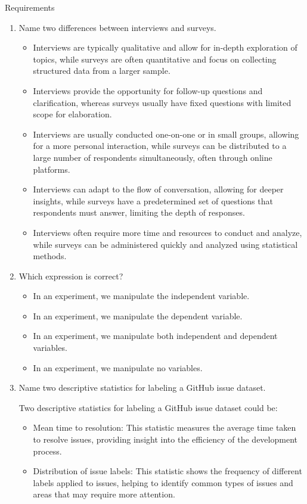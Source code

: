 \documentclass{article}
\begin{document}
\begin{exercise}{Requirements}
\begin{enumerate}
    \item Name two differences between interviews and surveys. \begin{solution}
        \begin{itemize}
          \item Interviews are typically qualitative and allow for in-depth exploration of topics, while surveys are often quantitative and focus on collecting structured data from a larger sample.
          \item Interviews provide the opportunity for follow-up questions and clarification, whereas surveys usually have fixed questions with limited scope for elaboration.
          \item Interviews are usually conducted one-on-one or in small groups, allowing for a more personal interaction, while surveys can be distributed to a large number of respondents simultaneously, often through online platforms.
          \item Interviews can adapt to the flow of conversation, allowing for deeper insights, while surveys have a predetermined set of questions that respondents must answer, limiting the depth of responses.
          \item Interviews often require more time and resources to conduct and analyze, while surveys can be administered quickly and analyzed using statistical methods.
        \end{itemize}
      \end{solution}

    \item Which expression is correct?
      \begin{itemize}
        \item In an experiment, we manipulate the independent variable. 
        \item In an experiment, we manipulate the dependent variable. 
        \item In an experiment, we manipulate both independent and dependent variables. 
        \item In an experiment, we manipulate no variables. 
      \end{itemize}

    \item Name two descriptive statistics for labeling a GitHub issue dataset. \begin{solution}
        Two descriptive statistics for labeling a GitHub issue dataset could be:
        \begin{itemize}
          \item Mean time to resolution: This statistic measures the average time taken to resolve issues, providing insight into the efficiency of the development process.
          \item Distribution of issue labels: This statistic shows the frequency of different labels applied to issues, helping to identify common types of issues and areas that may require more attention.
        \end{itemize}
      \end{solution}


\end{enumerate}
\end{exercise}
\end{document}
